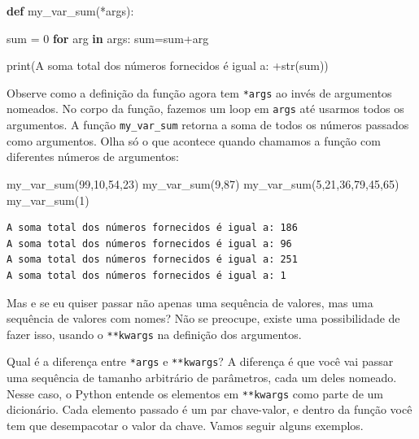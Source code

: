 \documentclass[
  brazilian,
  letterpaper,
  DIV=11,
  numbers=noendperiod]{scrreprt}
\newenvironment{Shaded}{\begin{snugshade}}{\end{snugshade}}
\newcommand{\BuiltInTok}[1]{\textcolor[rgb]{0.00,0.23,0.31}{#1}}
\newcommand{\ControlFlowTok}[1]{\textcolor[rgb]{0.00,0.23,0.31}{\textbf{#1}}}
\newcommand{\DecValTok}[1]{\textcolor[rgb]{0.68,0.00,0.00}{#1}}
\newcommand{\KeywordTok}[1]{\textcolor[rgb]{0.00,0.23,0.31}{\textbf{#1}}}
\newcommand{\NormalTok}[1]{\textcolor[rgb]{0.00,0.23,0.31}{#1}}
\newcommand{\OperatorTok}[1]{\textcolor[rgb]{0.37,0.37,0.37}{#1}}
\newcommand{\StringTok}[1]{\textcolor[rgb]{0.13,0.47,0.30}{#1}}
\begin{document}
\begin{Shaded}
\begin{Highlighting}[]
\KeywordTok{def}\NormalTok{ my\_var\_sum(}\OperatorTok{*}\NormalTok{args):}
    
    \BuiltInTok{sum} \OperatorTok{=} \DecValTok{0}
    \ControlFlowTok{for}\NormalTok{ arg }\KeywordTok{in}\NormalTok{ args:}
        \BuiltInTok{sum}\OperatorTok{=}\BuiltInTok{sum}\OperatorTok{+}\NormalTok{arg}
        
    \BuiltInTok{print}\NormalTok{(}\StringTok{\textquotesingle{}A soma total dos números fornecidos é igual a: \textquotesingle{}}\OperatorTok{+}\BuiltInTok{str}\NormalTok{(}\BuiltInTok{sum}\NormalTok{))}
\end{Highlighting}
\end{Shaded}

Observe como a definição da função agora tem \texttt{*args} ao invés de
argumentos nomeados. No corpo da função, fazemos um loop em
\texttt{args} até usarmos todos os argumentos. A função
\texttt{my\_var\_sum} retorna a soma de todos os números passados como
argumentos. Olha só o que acontece quando chamamos a função com
diferentes números de argumentos:

\begin{Shaded}
\begin{Highlighting}[]
\NormalTok{my\_var\_sum(}\DecValTok{99}\NormalTok{,}\DecValTok{10}\NormalTok{,}\DecValTok{54}\NormalTok{,}\DecValTok{23}\NormalTok{)}
\NormalTok{my\_var\_sum(}\DecValTok{9}\NormalTok{,}\DecValTok{87}\NormalTok{)}
\NormalTok{my\_var\_sum(}\DecValTok{5}\NormalTok{,}\DecValTok{21}\NormalTok{,}\DecValTok{36}\NormalTok{,}\DecValTok{79}\NormalTok{,}\DecValTok{45}\NormalTok{,}\DecValTok{65}\NormalTok{)}
\NormalTok{my\_var\_sum(}\DecValTok{1}\NormalTok{)}
\end{Highlighting}
\end{Shaded}

\begin{verbatim}
A soma total dos números fornecidos é igual a: 186
A soma total dos números fornecidos é igual a: 96
A soma total dos números fornecidos é igual a: 251
A soma total dos números fornecidos é igual a: 1
\end{verbatim}

Mas e se eu quiser passar não apenas uma sequência de valores, mas uma
sequência de valores com nomes? Não se preocupe, existe uma
possibilidade de fazer isso, usando o \texttt{**kwargs} na definição dos
argumentos.

Qual é a diferença entre \texttt{*args} e \texttt{**kwargs}? A diferença
é que você vai passar uma sequência de tamanho arbitrário de parâmetros,
cada um deles nomeado. Nesse caso, o Python entende os elementos em
\texttt{**kwargs} como parte de um dicionário. Cada elemento passado é
um par chave-valor, e dentro da função você tem que desempacotar o valor
da chave. Vamos seguir alguns exemplos.
\end{document}

